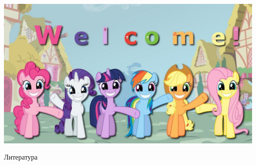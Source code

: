 \documentclass[11pt,aspectratio=169,handout]{beamer}
\begin{document}
\begin{frame}{}

\begin{center}
\includegraphics[scale=1.0]{images/welcome.jpeg}
\end{center}

\end{frame}

\begin{frame}[allowframebreaks]{Литература}


\end{frame}
\end{document}
